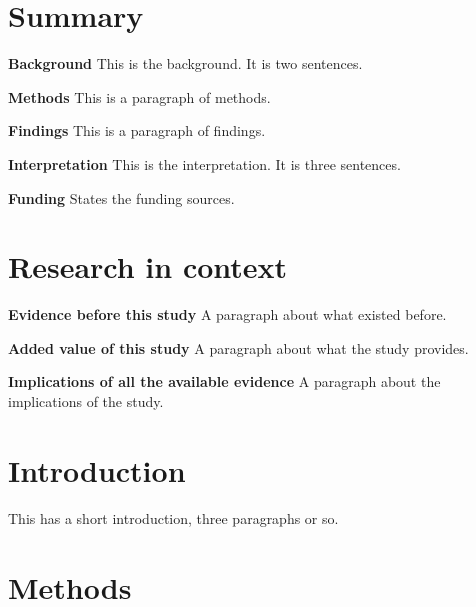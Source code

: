 \documentclass[preprint,12pt]{elsarticle}
\begin{document}
\begin{frontmatter}





\end{frontmatter}



\section*{Summary}
\textbf{Background} This is the background. It is two sentences.

\textbf{Methods} This is a paragraph of methods.


\textbf{Findings} This is a paragraph of findings.

\textbf{Interpretation} This is the interpretation. It is three sentences.

\textbf{Funding} States the funding sources.

\section*{Research in context}

\textbf{Evidence before this study} 
A paragraph about what existed before.

\textbf{Added value of this study} 
A paragraph about what the study provides.

\textbf{Implications of all the available evidence} 
A paragraph about the implications of the study.

\section*{Introduction}
This has a short introduction, three paragraphs or so.

\section*{Methods}
\end{document}
